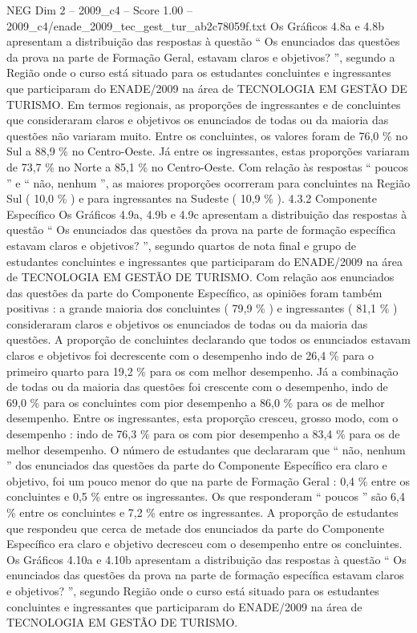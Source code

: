 \begin{textsample}{NEG Dim 2 – 2009\_c4 – Score 1.00 – 2009\_c4/enade\_2009\_tec\_gest\_tur\_ab2c78059f.txt}
Os Gráficos 4.8a e 4.8b apresentam a distribuição das respostas à questão “ Os enunciados das questões da prova na parte de Formação Geral, estavam claros e objetivos? ”, segundo a Região onde o curso está situado para os estudantes concluintes e ingressantes que participaram do ENADE/2009 na área de TECNOLOGIA EM GESTÃO DE TURISMO.
Em termos regionais, as proporções de ingressantes e de concluintes que consideraram claros e objetivos os enunciados de todas ou da maioria das questões não variaram muito.
Entre os concluintes, os valores foram de 76,0 \% no Sul a 88,9 \% no Centro-Oeste.
Já entre os ingressantes, estas proporções variaram de 73,7 \% no Norte a 85,1 \% no Centro-Oeste.
Com relação às respostas “ poucos ” e “ não, nenhum ”, as maiores proporções ocorreram para concluintes na Região Sul ( 10,0 \% ) e para ingressantes na Sudeste ( 10,9 \% ). 4.3.2 Componente Específico Os Gráficos 4.9a, 4.9b e 4.9c apresentam a distribuição das respostas à questão “ Os enunciados das questões da prova na parte de formação específica estavam claros e objetivos? ”, segundo quartos de nota final e grupo de estudantes concluintes e ingressantes que participaram do ENADE/2009 na área de TECNOLOGIA EM GESTÃO DE TURISMO.
Com relação aos enunciados das questões da parte do Componente Específico, as opiniões foram também positivas : a grande maioria dos concluintes ( 79,9 \% ) e ingressantes ( 81,1 \% ) consideraram claros e objetivos os enunciados de todas ou da maioria das questões.
A proporção de concluintes declarando que todos os enunciados estavam claros e objetivos foi decrescente com o desempenho indo de 26,4 \% para o primeiro quarto para 19,2 \% para os com melhor desempenho.
Já a combinação de todas ou da maioria das questões foi crescente com o desempenho, indo de 69,0 \% para os concluintes com pior desempenho a 86,0 \% para os de melhor desempenho.
Entre os ingressantes, esta proporção cresceu, grosso modo, com o desempenho : indo de 76,3 \% para os com pior desempenho a 83,4 \% para os de melhor desempenho.
O número de estudantes que declararam que “ não, nenhum ” dos enunciados das questões da parte do Componente Específico era claro e objetivo, foi um pouco menor do que na parte de Formação Geral : 0,4 \% entre os concluintes e 0,5 \% entre os ingressantes.
Os que responderam “ poucos ” são 6,4 \% entre os concluintes e 7,2 \% entre os ingressantes.
A proporção de estudantes que respondeu que cerca de metade dos enunciados da parte do Componente Específico era claro e objetivo decresceu com o desempenho entre os concluintes.
Os Gráficos 4.10a e 4.10b apresentam a distribuição das respostas à questão “ Os enunciados das questões da prova na parte de formação específica estavam claros e objetivos? ”, segundo Região onde o curso está situado para os estudantes concluintes e ingressantes que participaram do ENADE/2009 na área de TECNOLOGIA EM GESTÃO DE TURISMO.

\end{textsample}

